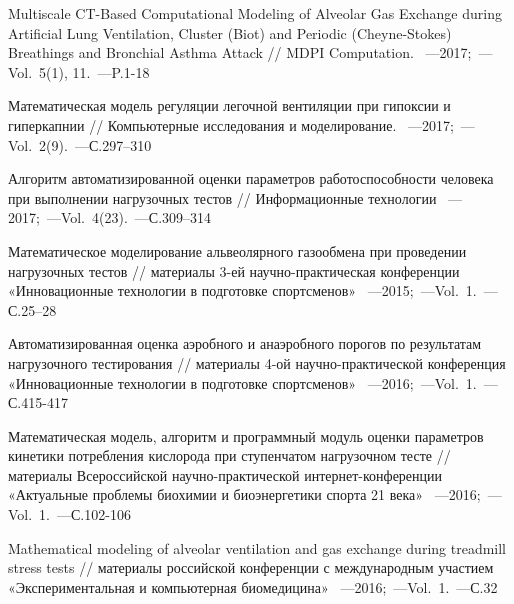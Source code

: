 \clearpage
{}
{}	%

\begin{thebibliography}{}
    
     Multiscale CT-Based Computational Modeling of Alveolar Gas Exchange during Artificial Lung Ventilation, Cluster (Biot) and Periodic (Cheyne-Stokes) Breathings and Bronchial Asthma Attack // MDPI Computation. ~---2017;~---Vol.~5(1), 11.~---P.1-18
    
     Математическая модель регуляции легочной вентиляции при гипоксии и гиперкапнии // Компьютерные исследования и моделирование. ~---2017;~---Vol.~2(9).~---С.297–310
    
     Алгоритм автоматизированной оценки параметров работоспособности человека при выполнении нагрузочных тестов // Информационные технологии ~---2017;~---Vol.~4(23).~---С.309–314

     Математическое моделирование альвеолярного газообмена при проведении нагрузочных тестов // материалы 3-ей научно-практическая конференции «Инновационные технологии в подготовке спортсменов» ~---2015;~---Vol.~1.~---С.25–28
    
     Автоматизированная оценка аэробного и анаэробного порогов по результатам нагрузочного тестирования // материалы 4-ой научно-практической конференция «Инновационные технологии в подготовке спортсменов» ~---2016;~---Vol.~1.~---С.415-417
    
     Математическая модель, алгоритм и программный модуль оценки параметров кинетики потребления кислорода при ступенчатом нагрузочном тесте // материалы Всероссийской научно-практической интернет-конференции «Актуальные проблемы биохимии и биоэнергетики спорта 21 века» ~---2016;~---Vol.~1.~---С.102-106

     Mathematical modeling of alveolar ventilation and gas exchange during treadmill stress tests // материалы российской конференции с международным участием «Экспериментальная и компьютерная биомедицина» ~---2016;~---Vol.~1.~---С.32
    

\end{thebibliography}
